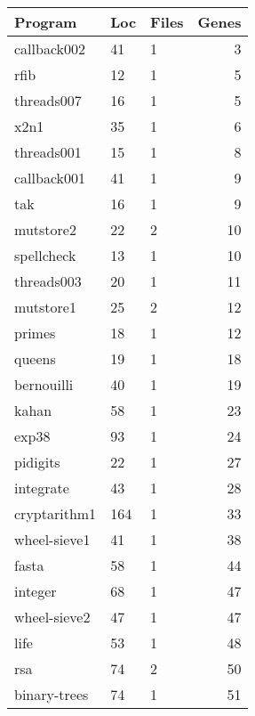 \begin{table}[!htb]
    \begin{minipage}{.5\linewidth}
      \centering
        \begin{tabular}{lllr}
            \hline
            Program    &   Loc    &   Files   &   Genes\\
            \hline
            callback002 &   41  &   1   &   3\\ 
            rfib        &   12  &   1   &   5\\
            threads007  &   16  &   1   &   5\\
            x2n1        &   35  &   1   &   6\\
            threads001  &   15  &   1   &   8\\
            callback001 &   41  &   1   &   9\\ 
            tak         &   16  &   1   &   9\\
            mutstore2   &   22  &   2   &   10\\
            spellcheck  &   13  &   1   &   10\\
            threads003  &   20  &   1   &   11\\
            mutstore1   &   25  &   2   &   12\\
            primes      &   18  &   1   &   12\\
            queens      &   19  &   1   &   18\\
            bernouilli  &   40  &   1   &   19\\
            kahan       &   58  &   1   &   23\\
            exp38       &   93  &   1   &   24\\
            pidigits    &   22  &   1   &   27\\
            integrate   &   43  &   1   &   28\\
            cryptarithm1&   164 &   1   &   33\\
            wheel-sieve1&   41  &   1   &   38\\
            fasta       &   58  &   1   &   44\\
            integer     &   68  &   1   &   47\\
            wheel-sieve2&   47  &   1   &   47\\
            life        &   53  &   1   &   48\\
            rsa         &   74  &   2   &   50\\
            binary-trees&   74  &   1   &   51\\

\end{tabular}
\end{minipage}
\end{table}
